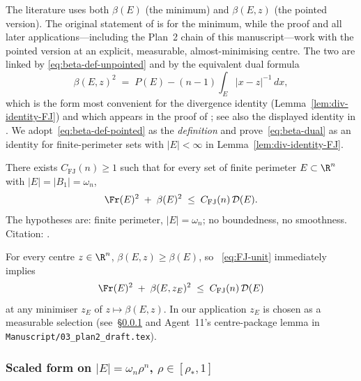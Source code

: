 \begin{remark}
The literature uses both $\beta(E)$ (the minimum) and $\beta(E,z)$ (the
pointed version). The original statement of \cite{FJ2014} is for the
minimum, while the proof and all later applications—including the
Plan~2 chain of this manuscript—work with the pointed version at an
explicit, measurable, almost-minimising centre. The two are linked by
\eqref{eq:beta-def-unpointed} and by the equivalent dual formula
\begin{equation}\label{eq:beta-dual}
   \beta(E,z)^2
   \;=\;
   P(E)-(n-1)\int_E|x-z|^{-1}\,dx,
\end{equation}
which is the form most convenient for the divergence identity
(Lemma~\ref{lem:div-identity-FJ}) and which appears in the proof of
\cite[Thm.~1.1]{FJ2014}; see also the displayed identity in
\cite[\S2.2]{FJ2014}. We adopt~\eqref{eq:beta-def-pointed} as the
\emph{definition} and prove~\eqref{eq:beta-dual} as an identity for
finite-perimeter sets with $|E|<\infty$ in
Lemma~\ref{lem:div-identity-FJ}.
\end{remark}

\begin{theorem}\label{thm:FJ}
There exists $C_{\mathrm{FJ}}(n)\ge 1$ such that for every set of
finite perimeter $E\subset\R^n$ with $|E|=|B_1|=\omega_n$,
\begin{equation}\label{eq:FJ-unit}
   \Fr(E)^2\;+\;\beta(E)^2
   \;\le\;C_{\mathrm{FJ}}(n)\,\mathcal D(E).
\end{equation}
The hypotheses are: finite perimeter, $|E|=\omega_n$; no boundedness,
no smoothness. Citation: \cite[Thm.~1.1]{FJ2014}.
\end{theorem}

\begin{remark}
For every centre $z\in\R^n$, $\beta(E,z)\ge\beta(E)$, so~%
\eqref{eq:FJ-unit} immediately implies
\begin{equation}\label{eq:FJ-unit-pointed}
   \Fr(E)^2\;+\;\beta(E,z_E)^2
   \;\le\;C_{\mathrm{FJ}}(n)\,\mathcal D(E)
\end{equation}
at any minimiser $z_E$ of $z\mapsto\beta(E,z)$. In our application
$z_E$ is chosen as a measurable selection (see~\S\ref{ssec:scaled} and
Agent~11's centre-package lemma in
\texttt{Manuscript/03\_plan2\_draft.tex}).
\end{remark}

\subsubsection{Scaled form on $|E|=\omega_n\rho^n$,
$\rho\in[\rho_*,1]$}\label{ssec:scaled}

